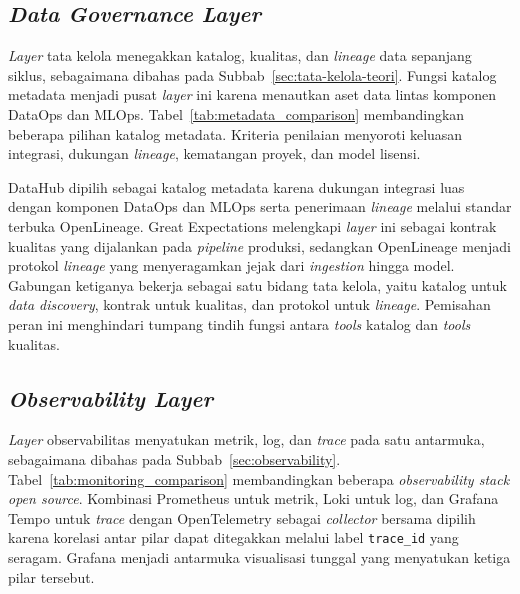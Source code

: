 

\subsection{\textit{Data Governance Layer}}
\label{subsec:pilih-tata-kelola}

\textit{Layer} tata kelola menegakkan katalog, kualitas, dan \textit{lineage} data sepanjang siklus, sebagaimana dibahas pada Subbab~\ref{sec:tata-kelola-teori}. Fungsi katalog metadata menjadi pusat \textit{layer} ini karena menautkan aset data lintas komponen DataOps dan MLOps. Tabel~\ref{tab:metadata_comparison} membandingkan beberapa pilihan katalog metadata. Kriteria penilaian menyoroti keluasan integrasi, dukungan \textit{lineage}, kematangan proyek, dan model lisensi.

DataHub dipilih sebagai katalog metadata karena dukungan integrasi luas dengan komponen DataOps dan MLOps serta penerimaan \textit{lineage} melalui standar terbuka OpenLineage. Great Expectations melengkapi \textit{layer} ini sebagai kontrak kualitas yang dijalankan pada \textit{pipeline} produksi, sedangkan OpenLineage menjadi protokol \textit{lineage} yang menyeragamkan jejak dari \textit{ingestion} hingga model. Gabungan ketiganya bekerja sebagai satu bidang tata kelola, yaitu katalog untuk \textit{data discovery}, kontrak untuk kualitas, dan protokol untuk \textit{lineage}. Pemisahan peran ini menghindari tumpang tindih fungsi antara \textit{tools} katalog dan \textit{tools} kualitas.



\subsection{\textit{Observability Layer}}
\label{subsec:pilih-observabilitas}

\textit{Layer} observabilitas menyatukan metrik, log, dan \textit{trace} pada satu antarmuka, sebagaimana dibahas pada Subbab~\ref{sec:observability}. Tabel~\ref{tab:monitoring_comparison} membandingkan beberapa \textit{observability stack} \textit{open source}. Kombinasi Prometheus untuk metrik, Loki untuk log, dan Grafana Tempo untuk \textit{trace} dengan OpenTelemetry sebagai \textit{collector} bersama dipilih karena korelasi antar pilar dapat ditegakkan melalui label \texttt{trace\_id} yang seragam. Grafana menjadi antarmuka visualisasi tunggal yang menyatukan ketiga pilar tersebut.

